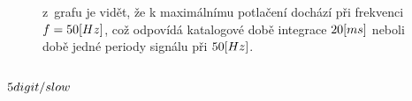 \documentclass{article}
\begin{document}
\begin{figure}[H]
\begin{minipage}[t]{0.7\textwidth}
    \end{minipage}
    \hfill
    \begin{minipage}[t]{0.2\textwidth}
        \vspace{-80mm}
        z~grafu je vidět, že k maximálnímu potlačení dochází při frekvenci \(f = 50\-[Hz]\), což odpovídá katalogové době integrace \(20\-[ms]\) neboli době jedné periody signálu při \(50\-[Hz]\).
    \end{minipage}
\end{figure}

\subsubsection*{\(5\-digit/slow\)} 
\end{document}
